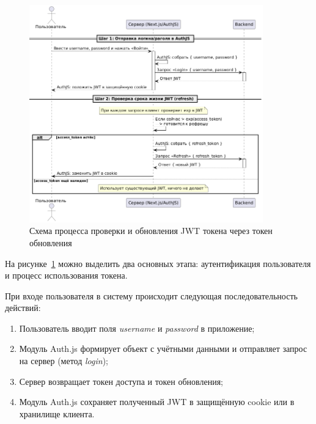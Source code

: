 \begin{figure}[h]
    \centering
    \includegraphics[width=0.9\textwidth]{static/diagrams/AuthRefresh.png}
    \caption{Схема процесса проверки и обновления JWT токена через токен обновления}
    \label{fig:auth-refresh}
\end{figure}

На рисунке~\ref{fig:auth-refresh} можно выделить два основных этапа: аутентификация пользователя и процесс использования токена.

При входе пользователя в систему происходит следующая последовательность действий:
\begin{enumerate}
    \item Пользователь вводит поля \textit{username} и \textit{password} в приложение;
    \item Модуль Auth.js формирует объект с учётными данными и отправляет запрос на сервер (метод \textit{login});
    \item Сервер возвращает токен доступа и токен обновления;
    \item Модуль Auth.js сохраняет полученный JWT в защищённую cookie или в хранилище клиента.
\end{enumerate}

